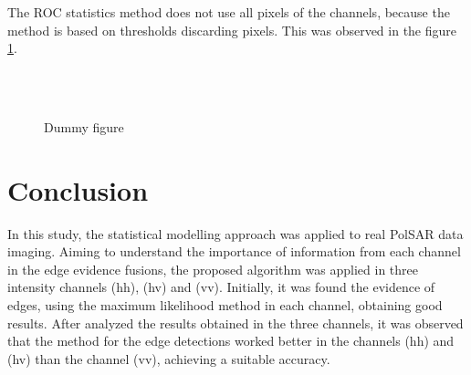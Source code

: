 \documentclass[conference]{IEEEtran}
\begin{document}
The ROC statistics method does not use all pixels of the channels, because the method is based on thresholds discarding pixels. This was observed in the figure \ref{fig_03}.

\begin{figure}[!ht]
     \hfill
     \\
     \hfill
     \\
     \caption{Dummy figure}
     \label{fig_03}
   \end{figure}

\section{Conclusion}\label{sec_08}
In this study, the statistical modelling approach was applied to real PolSAR data imaging. Aiming to understand the importance of information from each channel in the edge evidence fusions, the proposed algorithm was applied in three intensity channels (hh), (hv) and (vv). Initially, it was found the evidence of edges, using the maximum likelihood  method in each channel, obtaining good results. After analyzed the results obtained in the three channels, it was observed that the method for the edge detections worked better in the channels (hh) and (hv) than the channel (vv), achieving a suitable accuracy.
\end{document}
